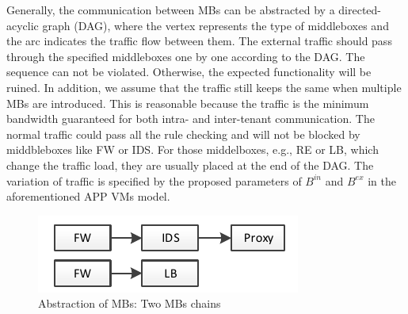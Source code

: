 \documentclass[review]{elsarticle}
\begin{document}
Generally, the communication between MBs can be abstracted by a directed-acyclic graph (DAG), where the vertex represents the type of middleboxes and the arc indicates the traffic flow between them. The external traffic should pass through the specified middleboxes one by one according to the DAG. The sequence can not be violated. Otherwise, the expected functionality will be ruined. In addition, we assume that the traffic still keeps the same when multiple MBs are introduced. This is reasonable because the traffic is the minimum bandwidth guaranteed for both intra- and inter-tenant communication. The normal traffic could pass all the rule checking and will not be blocked by middbleboxes like FW or IDS. For those middelboxes, e.g., RE or LB, which change the traffic load, they are usually placed at the end of the DAG. The variation of traffic is specified by the proposed parameters of $B^{in}$ and $B^{ex}$ in the aforementioned APP VMs model.

\begin{figure}
	\centering
		\includegraphics[width=3.0 in]{fig/chain.pdf}
	\caption{Abstraction of MBs: Two MBs chains}
	\label{fig:chain}
\end{figure}

\end{document}
